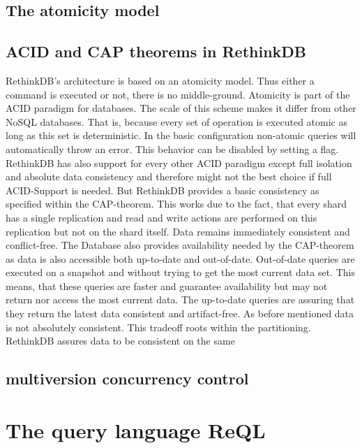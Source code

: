 \subsection{The atomicity model}



\subsection{ACID and CAP theorems in RethinkDB}

RethinkDB’s architecture is based on an atomicity model. Thus either a command is executed or not, there is no middle-ground. Atomicity is part of the ACID paradigm for databases. The scale of this scheme makes it differ from other NoSQL databases. That is, because every set of operation is executed atomic as long as this set is deterministic. In the basic configuration non-atomic queries will automatically throw an error. This behavior can be disabled by setting a flag. 
RethinkDB has also support for every other ACID paradigm except full isolation and absolute data consistency and therefore might not the best choice if full ACID-Support is needed. But RethinkDB provides a basic consistency as specified within the CAP-theorem. This works due to the fact, that every shard has a single replication and read and write actions are performed on this replication but not on the shard itself. Data remains immediately consistent and conflict-free. 
The Database also provides availability needed by the CAP-theorem as data is also accessible both up-to-date and out-of-date. Out-of-date queries are executed on a snapshot and without trying to get the most current data set. This means, that these queries are faster and guarantee availability but may not return nor access the most current data. The up-to-date queries are assuring that they return the latest data consistent and artifact-free. As before mentioned data is not absolutely consistent. This tradeoff roots within the partitioning. RethinkDB assures data to be consistent on the same 

\subsection{multiversion concurrency control}

\section{The query language ReQL}


